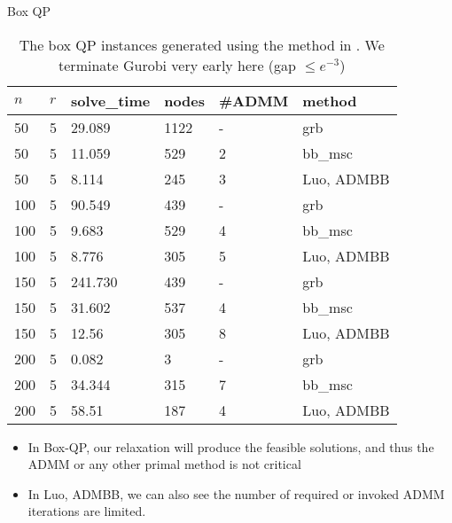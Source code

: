 \documentclass[aspectratio=1610, 9pt]{beamer}
\begin{document}
\begin{frame}[standout]{Box QP}
  \small
  \begin{table}[h!]
    \centering
    \begin{tabular}{llllll}
      \toprule
      \(n\) & \(r\) & solve\_time & nodes & \#ADMM & method              \\
      \midrule
      50    & 5     & 29.089      & 1122  & -      & grb                 \\
      50    & 5     & 11.059      & 529   & 2      & bb\_msc             \\
      50    & 5     & 8.114       & 245   & 3      & \textsf{Luo, ADMBB} \\
      100   & 5     & 90.549      & 439   & -      & grb                 \\
      100   & 5     & 9.683       & 529   & 4      & bb\_msc             \\
      100   & 5     & 8.776       & 305   & 5      & \textsf{Luo, ADMBB} \\
      150   & 5     & 241.730     & 439   & -      & grb                 \\
      150   & 5     & 31.602      & 537   & 4      & bb\_msc             \\
      150   & 5     & 12.56       & 305   & 8      & \textsf{Luo, ADMBB} \\
      200   & 5     & 0.082       & 3     & -      & grb                 \\
      200   & 5     & 34.344      & 315   & 7      & bb\_msc             \\
      200   & 5     & 58.51       & 187   & 4      & \textsf{Luo, ADMBB} \\
      \bottomrule
    \end{tabular}
    \caption{The box QP instances generated using the method in \cite{luo_new_2019}.
      We terminate Gurobi very early here (gap \(\le e^{-3}\))}


    \begin{itemize}
      \item In Box-QP, our relaxation will produce the feasible solutions, and thus the ADMM or any other primal method is not critical
      \item In \textsf{Luo, ADMBB}, we can also see the number of required or invoked ADMM iterations are limited.
    \end{itemize}
  \end{table}
  \normalsize

\end{frame}
\end{document}
